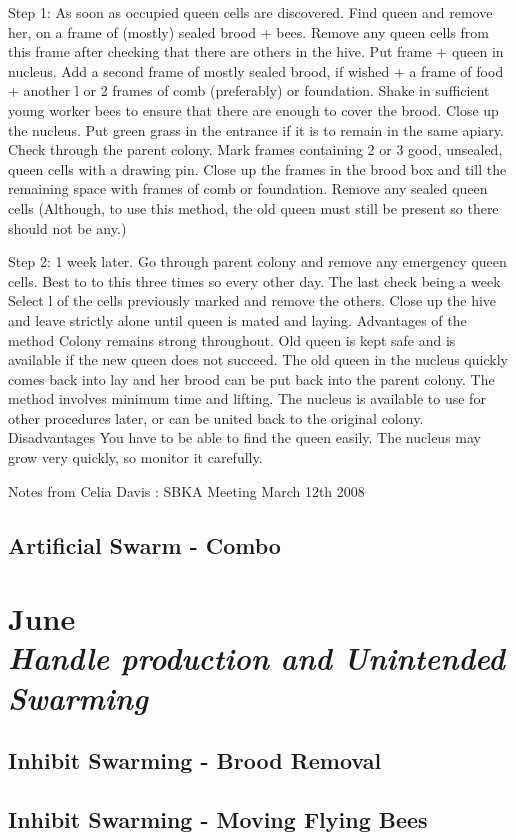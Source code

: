 \documentclass[12pt, a5paper, twoside]{book}
\newcommand\Chapter[2]{\chapter
  [#1\hfil\hbox{}\protect\linebreak{\itshape#2}]%
  {#1\\[2ex]\Large\itshape#2}%
  \markboth{\MakeUppercase{\chaptername\ \thechapter.\ #1}}{}%
}
\begin{document}
Step 1: As soon as occupied queen cells are discovered.
Find queen and remove her, on a frame of (mostly) sealed brood + bees. Remove any queen cells from this frame after checking that there are others in the hive.
Put frame + queen in nucleus.
Add a second frame of mostly sealed brood, if wished + a frame of food + another l or 2
frames of comb (preferably) or foundation.
Shake in sufficient young worker bees to ensure that there are enough to cover the brood.
Close up the nucleus. Put green grass in the entrance if it is to remain in the same apiary.
Check through the parent colony.  Mark frames containing 2 or 3 good, unsealed, queen cells with a drawing pin.
Close up the frames in the brood box and till the remaining space with frames of comb or foundation.
Remove any sealed queen cells (Although, to use this method, the old queen must still be present so there should not be any.)
 
Step 2: 1 week later.
Go through parent colony and remove any emergency queen cells.  Best to to this three times so every other day.  The last check being a week
Select l of the cells previously marked and remove the others.
Close up the hive and leave strictly alone until queen is mated and laying.
Advantages of the method
Colony remains strong throughout.
Old queen is kept safe and is available if the new queen does not succeed.
The old queen in the nucleus quickly comes back into lay and her brood can be put back into the parent colony.
The method involves minimum time and lifting.
The nucleus is available to use for other procedures later, or can be united back to the original colony.
Disadvantages
You have to be able to find the queen easily.
The nucleus may grow very quickly, so monitor it carefully.
 
Notes from Celia Davis : SBKA Meeting March 12th 2008


\section{Artificial Swarm - Combo}



\Chapter{June}{Handle production and Unintended Swarming}

\section{Inhibit Swarming - Brood Removal}

\section{Inhibit Swarming - Moving Flying Bees}
\end{document}
